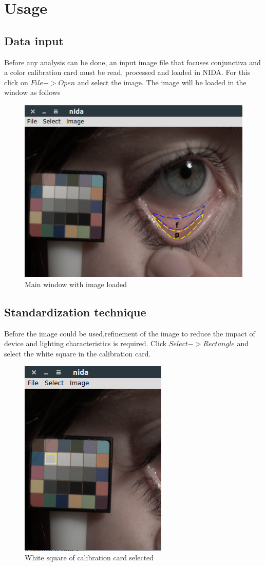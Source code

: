 \documentclass[peerreview]{IEEEtran}
\begin{document}
\section{Usage}
\subsection{Data input}
Before any analysis can be done, an input image file that focuses conjunctiva and a color calibration card must be read, processed and 
loaded in NIDA. For this click on $ File->Open$ and select the image. The image will be loaded in the window as follows
\begin{figure}[htp]
 \centering
 \includegraphics[width=0.5\linewidth]{main.png}
 \caption{Main window with image loaded}
 \label{fig:1}
\end{figure}

\subsection{Standardization technique}
Before the image could be used,refinement of the image to reduce the impact of device and lighting characteristics is required.
Click $Select->Rectangle$ and select the white square in the calibration card.
\begin{figure}[htp]
 \centering
 \includegraphics[width=0.5\linewidth]{rec.png}
 \caption{White square of calibration card selected}
 \label{fig:2}
\end{figure}
\end{document}
